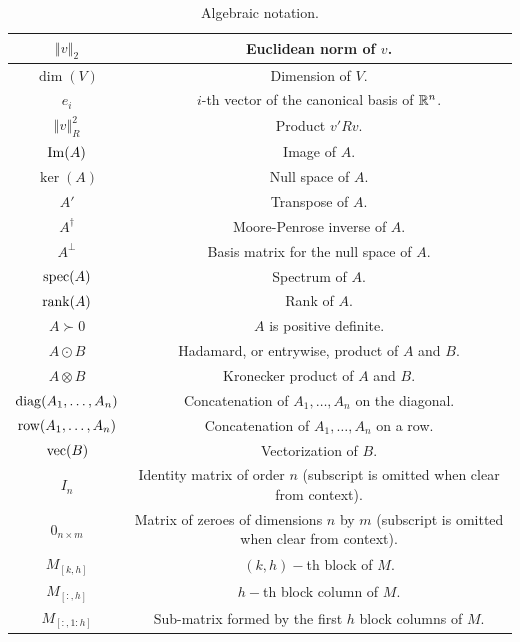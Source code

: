 \begin{table}[ht]
  \centering
  \renewcommand{\arraystretch}{1.2}
  \begin{tabular}{|c|c|}
    \hline
    $\left\Vert v \right\Vert_2$ & Euclidean norm of $v$.\\
    \hline
    $\dim(V)$ & Dimension of $V$.\\
    \hline
    $e_i$ & $i$-th vector of the canonical basis of $\mathbb{R}^n$.\\
    \hline
    $\left\Vert v \right\Vert^{2}_R$ & Product $v'Rv$.\\
    \hline
    $\operatorname{Im}(A)$ & Image of $A$.\\
    \hline
    $\ker(A)$ & Null space of $A$.\\
    \hline
    $A'$ & Transpose of $A$.\\
    \hline
    $A^{\dagger}$ & Moore-Penrose inverse of $A$.\\
    \hline
    $A^\perp$ & Basis matrix for the null space of $A$.\\
    \hline
    $\operatorname{spec}(A)$ & Spectrum of $A$.\\
    \hline
    $\operatorname{rank}(A)$ & Rank of $A$.\\
    \hline
    $A\succ 0$ & $A$ is positive definite.\\
    \hline
    $A \odot B$ & Hadamard, or entrywise, product of $A$ and $B$.\\
    \hline
    $A \otimes B$ & Kronecker product of $A$ and $B$.\\
    \hline
    $\operatorname{diag}(A_1,\dotsc,A_n)$ & Concatenation of $A_1,\dotsc,A_n$ on the diagonal.\\
    \hline
    $\operatorname{row}(A_1,\dotsc,A_n)$ & Concatenation of $A_1,\dotsc,A_n$ on a row.\\
    \hline
    $\mathrm{vec}(B)$ & Vectorization of $B$.\\
    \hline
    $I_n$ & \makecell{Identity matrix of order $n$\\(subscript is omitted when clear from context).}\\
    \hline
    $0_{n \times m}$ & \makecell{Matrix of zeroes of dimensions $n$ by $m$\\(subscript is omitted when clear from context).}\\
    \hline
    $M_{[k,h]}$ & $(k,h)-$th block of $M$.\\
    \hline
    $M_{[:,h]}$ & $h-$th block column of $M$.\\
    \hline
    $M_{[:,1:h]}$ & Sub-matrix formed by the first $h$ block columns of $M$.\\
    \hline
  \end{tabular}
  \renewcommand{\arraystretch}{1.0}
  \caption{Algebraic notation.}
  \label{tab:notation}
\end{table}

